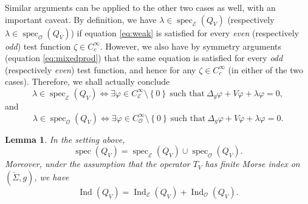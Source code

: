 \documentclass[10pt]{amsart}
\let\mathcal\mathscr
\newcounter{cas}
\DeclareMathOperator{\Ind}{Ind}
\DeclareMathOperator{\spec}{spec}
\newtheorem{lem}[thm]{Lemma}
\theoremstyle{definition}
\begin{document}
Similar arguments can be applied to the other two cases as well, with an important caveat. By definition, we have $\lambda\in \spec_{\mathcal{E}} (Q_V)$ (respectively $\lambda\in \spec_{\mathcal{O}} (Q_V)$) if equation \eqref{eq:weak} is satisfied for every \emph{even} (respectively \emph{odd}) test function $\zeta\in C^{\infty}_c$. However, we also have by symmetry arguments (\cf equation \eqref{eq:mixedprod}) that the same equation is satisfied for every \emph{odd} (respectively \emph{even}) test function, and hence for any $\zeta\in C^{\infty}_c$ (in either of the two cases). Therefore, we shall actually conclude
\[
\lambda\in \spec_{\mathcal{E}} (Q_V) \iff \exists \varphi\in C^{\infty}_{\mathcal{E}}\setminus \left\{0\right\} \ \text{such that} \ \Delta_g \varphi+V\varphi+\lambda\varphi=0,
\]
and
\[
\lambda\in \spec_{\mathcal{O}} (Q_V) \iff \exists \varphi\in C^{\infty}_{\mathcal{O}}\setminus \left\{0\right\} \ \text{such that} \ \Delta_g \varphi+V\varphi+\lambda\varphi=0.
\]

\begin{lem}\label{lem:specadd}
In the setting above,
\[
\spec(Q_V)=\spec_{\mathcal{E}} (Q_V) \cup \spec_{\mathcal{O}} (Q_V).
\]
Moreover, under the assumption that the operator $T_V$ has finite Morse index on $(\check{\Sigma},g)$, we have
\[
\Ind(Q_V) = \Ind_{\mathcal{E}} (Q_V)+\Ind_{\mathcal{O}} (Q_V).
\]
\end{lem}
\end{document}

